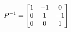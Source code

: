 \documentclass[preview]{standalone}
\begin{document}
\begin{align*}
\special{dvisvgm:raw <g id='unique000'>}P^{-1} = \begin{bmatrix} 1 & -1 & 0 \\ 0 & 1 & -1 \\ 0 & 0 & 1 \end{bmatrix}\special{dvisvgm:raw </g>}
\end{align*}
\end{document}
